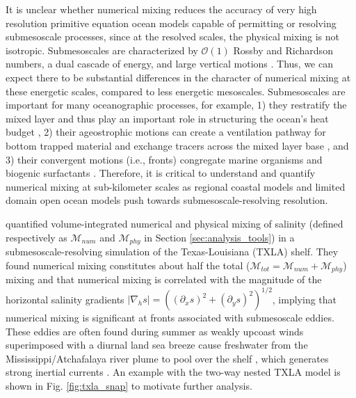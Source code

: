 \documentclass[draft]{agujournal2019}
\begin{document}
It is unclear whether numerical mixing reduces the accuracy of very high resolution primitive equation ocean models capable of permitting or resolving submesoscale processes, since at the resolved scales, the physical mixing is not isotropic. Submesoscales are characterized by $\mathcal{O}(1)$ Rossby and Richardson numbers, a dual cascade of energy, and large vertical motions \cite{McWilliams_2016, taylor2023submesoscale}. Thus, we can expect there to be substantial differences in the character of numerical mixing at these energetic scales, compared to less energetic mesoscales. Submesoscales are important for many oceanographic processes, for example, 1) they restratify the mixed layer and thus play an important role in structuring the ocean's heat budget \cite{boccaletti2007mixed, su2018ocean}, 2) their ageostrophic motions can create a ventilation pathway for bottom trapped material \cite{qu2022rapid} and exchange tracers across the mixed layer base \cite{balwada2021vertical}, and 3) their convergent motions (i.e., fronts) congregate marine organisms and biogenic surfactants \cite{mcwilliams2019survey, ruiz2019effects}. Therefore, it is critical to understand and quantify numerical mixing at sub-kilometer scales as regional coastal models and limited domain open ocean models push towards submesoscale-resolving resolution.

 quantified volume-integrated numerical and physical mixing of salinity (defined respectively as $\mathcal{M}_{num}$ and $\mathcal{M}_{phy}$ in Section \ref{sec:analysis_tools}) in a submesoscale-resolving simulation of the Texas-Louisiana (TXLA) shelf. They found numerical mixing constitutes about half the total ($\mathcal{M}_{tot} = \mathcal{M}_{num} + \mathcal{M}_{phy}$) mixing and that numerical mixing is correlated with the magnitude of the horizontal salinity gradients $|\nabla_h s| = \left((\partial_x s)^2 + (\partial_y s)^2 \right)^{1/2}$, implying that numerical mixing is significant at fronts associated with submesoscale eddies. These eddies are often found during summer as weakly upcoast winds superimposed with a diurnal land sea breeze cause freshwater from the Mississippi/Atchafalaya river plume to pool over the shelf \cite{Hetland_2017}, which generates strong inertial currents \cite{Kobashi_2020, qu2022rapid}. An example with the two-way nested TXLA model is shown in Fig. \ref{fig:txla_snap} to motivate further analysis.
\end{document}

